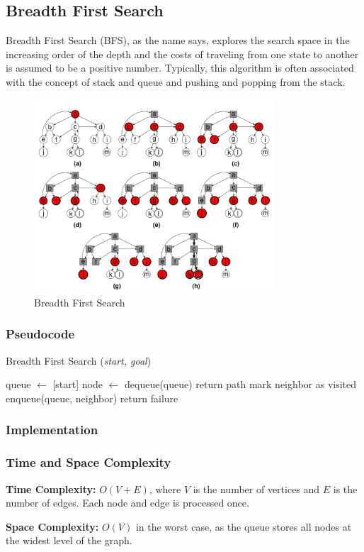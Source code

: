 \subsection{Breadth First Search}
\noindent Breadth First Search (BFS), as the name says, explores the search space in the increasing order of the depth and the costs of traveling from one state to another is assumed to be a positive number. Typically, this algorithm is often associated with the concept of stack and queue and pushing and popping from the stack.

\begin{figure}[H]
	\centering
	\includegraphics[width=0.8\textwidth]{./imgs/bfs.png}
	\caption{Breadth First Search}
\end{figure}

\subsubsection{Pseudocode}
\begin{algorithm}[H]
	\caption{Breadth First Search (\textit{start, goal})}
	\label{alg:bfs}
	\begin{algorithmic}[1]
	\State queue $\gets$ [start]
		\State node $\gets$ dequeue(queue)
			\State return path
		\EndIf
				\State mark neighbor as visited
				\State enqueue(queue, neighbor)
			\EndIf
		\EndFor
	\EndWhile
	\State return failure
	\end{algorithmic}
\end{algorithm}

\subsubsection{Implementation}

\subsubsection{Time and Space Complexity}
\textbf{Time Complexity:} $O(V + E)$, where $V$ is the number of vertices and $E$ is the number of edges. Each node and edge is processed once.

\textbf{Space Complexity:} $O(V)$ in the worst case, as the queue stores all nodes at the widest level of the graph.



